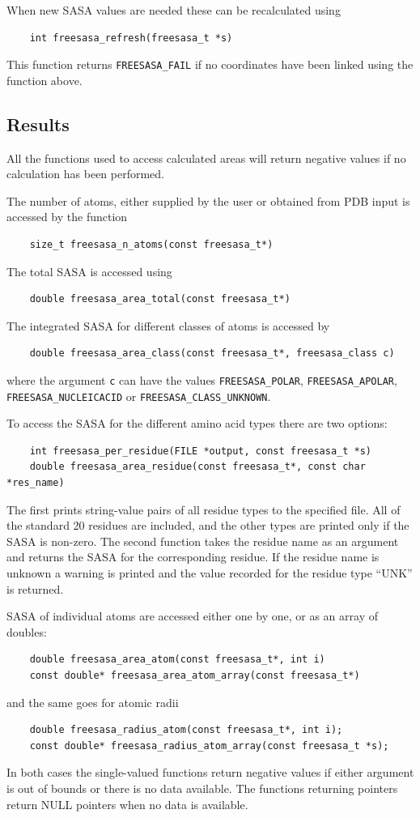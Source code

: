 \documentclass[a4paper,11pt]{article}
\begin{document}
When new SASA values are needed these can be recalculated using
\begin{verbatim} 
    int freesasa_refresh(freesasa_t *s)
\end{verbatim}
This function returns \verb|FREESASA_FAIL| if no coordinates have
been linked using the function above.

\subsection{Results}

All the functions used to access calculated areas will return negative
values if no calculation has been performed.

The number of atoms, either supplied by the user or obtained from PDB input
is accessed by the function
\begin{verbatim}
    size_t freesasa_n_atoms(const freesasa_t*)
\end{verbatim}
The total SASA is accessed using
\begin{verbatim}
    double freesasa_area_total(const freesasa_t*)
\end{verbatim}
The integrated SASA for different classes of atoms is accessed by
\begin{verbatim}
    double freesasa_area_class(const freesasa_t*, freesasa_class c)
\end{verbatim}
where the argument \verb|c| can have the values \verb|FREESASA_POLAR|, 
\verb|FREESASA_APOLAR|, \verb|FREESASA_NUCLEICACID| or 
\verb|FREESASA_CLASS_UNKNOWN|.

To access the SASA for the different amino acid types there are two
options:
\begin{verbatim}
    int freesasa_per_residue(FILE *output, const freesasa_t *s)
    double freesasa_area_residue(const freesasa_t*, const char *res_name)
\end{verbatim}
The first prints string-value pairs of all residue types to the
specified file. All of the standard 20 residues are included, and the
other types are printed only if the SASA is non-zero.  The second
function takes the residue name as an argument and returns the SASA for
the corresponding residue. If the residue name is unknown a warning is
printed and the value recorded for the residue type ``UNK'' is
returned.

SASA of individual atoms are accessed either one by one, or
as an array of doubles:
\begin{verbatim}
    double freesasa_area_atom(const freesasa_t*, int i)
    const double* freesasa_area_atom_array(const freesasa_t*)
\end{verbatim}
and the same goes for atomic radii
\begin{verbatim}
    double freesasa_radius_atom(const freesasa_t*, int i);
    const double* freesasa_radius_atom_array(const freesasa_t *s);
\end{verbatim}
In both cases the single-valued functions return negative values if
either argument is out of bounds or there is no data available. The
functions returning pointers return NULL pointers when no data is
available.
\end{document}
